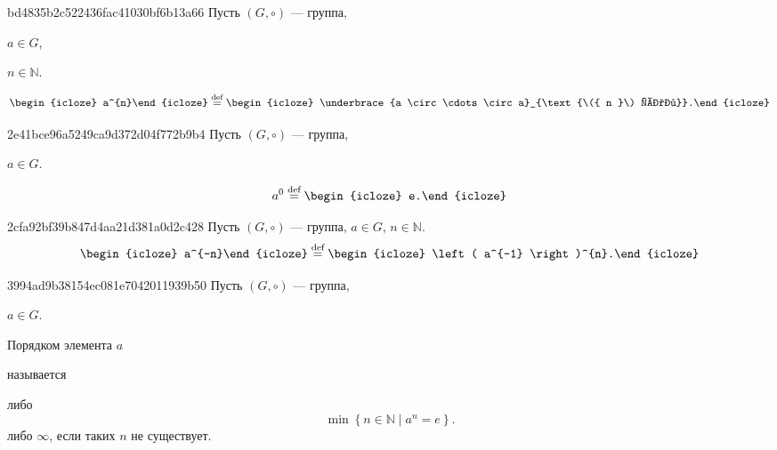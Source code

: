\begin{note}{bd4835b2c522436fac41030bf6b13a66}
    Пусть \({ (G, \circ)}\) --- группа, \begin{icloze}{4}\({ a \in G }\),\end{icloze}\: \begin{icloze}{3}\({ n \in \mathbb N }\).\end{icloze}
    \[
        \begin{icloze}{2}a^{n}\end{icloze} \overset{\text{def}}= \begin{icloze}{1}\underbrace{a \circ \cdots \circ a}_{\text{\({ n }\) раз}}.\end{icloze}
    \]
\end{note}

\begin{note}{2e41bce96a5249ca9d372d04f772b9b4}
    Пусть \({ (G, \circ)}\) --- группа, \begin{icloze}{2}\({ a \in G }\).\end{icloze}
    \[
        a^{0} \overset{\text{def}}= \begin{icloze}{1}e.\end{icloze}
    \]
\end{note}

\begin{note}{2cfa92bf39b847d4aa21d381a0d2c428}
    Пусть \({ (G, \circ)}\) --- группа, \({ a \in G }\),\: \({ n \in \mathbb N }\).
    \[
        \begin{icloze}{2}a^{-n}\end{icloze} \overset{\text{def}}= \begin{icloze}{1}\left( a^{-1} \right)^{n}.\end{icloze}
    \]
\end{note}

\begin{note}{3994ad9b38154ec081e7042011939b50}
    Пусть \({ (G, \circ)}\) --- группа, \begin{icloze}{3}\({ a \in G }\).\end{icloze}
    \begin{icloze}{2}Порядком элемента \({ a }\)\end{icloze} называется \begin{icloze}{1}либо
    \[
        \min \left\{ n \in \mathbb N \mid a^{n} = e \right\}.
    \]
    либо \({ \infty }\), если таких \({ n }\) не существует.\end{icloze}
\end{note}

